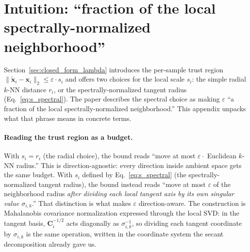 



\section{Intuition: ``fraction of the local spectrally-normalized neighborhood''}
\label{sec:appendix_spectral_intuition}

Section~\ref{sec:closed_form_lambda} introduces the per-sample trust region $\| \tilde{\mathbf{x}}_i - \mathbf{x}_i \|_2 \leq \varepsilon \cdot s_i$ and offers two choices for the local scale $s_i$: the simple radial $k$-NN distance $r_i$, or the spectrally-normalized tangent radius (Eq.~\ref{eq:s_spectral}). The paper describes the spectral choice as making $\varepsilon$ ``a fraction of the local spectrally-normalized neighborhood.'' This appendix unpacks what that phrase means in concrete terms.

\paragraph{Reading the trust region as a budget.}
With $s_i = r_i$ (the radial choice), the bound reads ``move at most $\varepsilon \cdot$ Euclidean $k$-NN radius.'' This is direction-agnostic: every direction inside ambient space gets the same budget. With $s_i$ defined by Eq.~\ref{eq:s_spectral} (the spectrally-normalized tangent radius), the bound instead reads ``move at most $\varepsilon$ of the neighborhood radius \emph{after dividing each local tangent axis by its own singular value $\sigma_{i,k}$}.'' That distinction is what makes $\varepsilon$ direction-aware. The construction is Mahalanobis covariance normalization expressed through the local SVD: in the tangent basis, $\mathbf{C}_i^{-1/2}$ acts diagonally as $\sigma_{i,k}^{-1}$, so dividing each tangent coordinate by $\sigma_{i,k}$ is the same operation, written in the coordinate system the secant decomposition already gave us.

